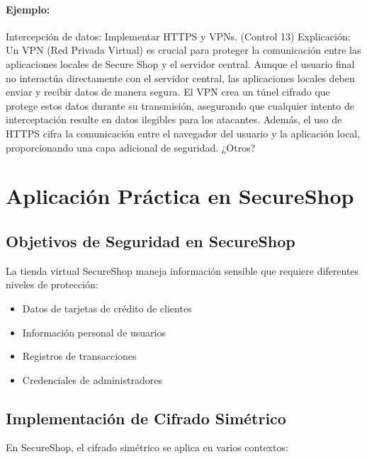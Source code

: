 \paragraph{Ejemplo:} Intercepción de datos: Implementar HTTPS y VPNs. (Control 13)
 Explicación: Un VPN (Red Privada Virtual) es crucial para proteger la comunicación entre las aplicaciones locales de Secure Shop y el servidor central. Aunque el usuario final no interactúa directamente con el servidor central, las aplicaciones locales deben enviar y recibir datos de manera segura. El VPN crea un túnel cifrado que protege estos datos durante su transmisión, asegurando que cualquier intento de interceptación resulte en datos ilegibles para los atacantes. Además, el uso de HTTPS cifra la comunicación entre el navegador del usuario y la aplicación local, proporcionando una capa adicional de seguridad.
 ¿Otros?

\section{Aplicación Práctica en SecureShop}

\subsection{Objetivos de Seguridad en SecureShop}
La tienda virtual SecureShop maneja información sensible que requiere diferentes niveles de protección:

\begin{itemize}
    \item Datos de tarjetas de crédito de clientes
    \item Información personal de usuarios
    \item Registros de transacciones
    \item Credenciales de administradores
\end{itemize}

\subsection{Implementación de Cifrado Simétrico}
En SecureShop, el cifrado simétrico se aplica en varios contextos:

